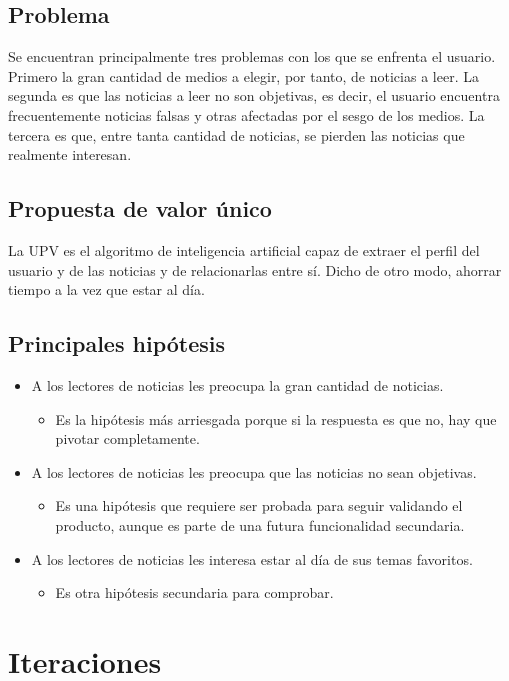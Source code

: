\subsection{Problema}
Se encuentran principalmente tres problemas con los que se enfrenta el usuario. Primero la gran cantidad de medios a elegir, por tanto, de noticias a leer. La segunda es que las noticias a leer no son objetivas, es decir, el usuario encuentra frecuentemente noticias falsas y otras afectadas por el sesgo de los medios. La tercera es que, entre tanta cantidad de noticias, se pierden las noticias que realmente interesan.

\subsection{Propuesta de valor único}
La UPV es el algoritmo de inteligencia artificial capaz de extraer el perfil del usuario y de las noticias y de relacionarlas entre sí. Dicho de otro modo, ahorrar tiempo a la vez que estar al día.

\subsection{Principales hipótesis}
\begin{itemize}
    \item A los lectores de noticias les preocupa la gran cantidad de noticias.
    \begin{itemize}
        \item Es la hipótesis más arriesgada porque si la respuesta es que no, hay que pivotar completamente.
    \end{itemize}
    \item A los lectores de noticias les preocupa que las noticias no sean objetivas.
    \begin{itemize}
        \item Es una hipótesis que requiere ser probada para seguir validando el producto, aunque es parte de una futura funcionalidad secundaria.
    \end{itemize}
    \item A los lectores de noticias les interesa estar al día de sus temas favoritos.
    \begin{itemize}
        \item Es otra hipótesis secundaria para comprobar.
    \end{itemize}
\end{itemize}

\section{Iteraciones}\label{sec:iteraciones}

